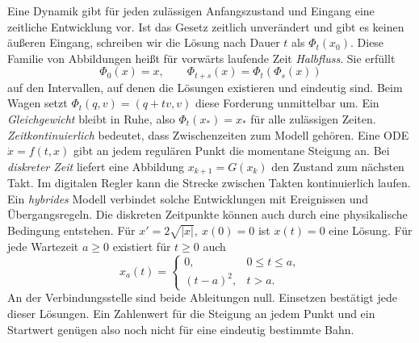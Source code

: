Eine Dynamik gibt für jeden zulässigen Anfangszustand und Eingang eine zeitliche Entwicklung vor. Ist das Gesetz zeitlich unverändert und gibt es keinen äußeren Eingang, schreiben wir die Lösung nach Dauer \(t\) als \(\Phi_t(x_0)\). Diese Familie von Abbildungen heißt für vorwärts laufende Zeit \emph{Halbfluss}. Sie erfüllt
\[
 \Phi_0(x)=x,\qquad \Phi_{t+s}(x)=\Phi_t(\Phi_s(x))
\]
auf den Intervallen, auf denen die Lösungen existieren und eindeutig sind. Beim Wagen setzt \(\Phi_t(q,v)=(q+tv,v)\) diese Forderung unmittelbar um. Ein \emph{Gleichgewicht} bleibt in Ruhe, also \(\Phi_t(x_*)=x_*\) für alle zulässigen Zeiten.
\emph{Zeitkontinuierlich} bedeutet, dass Zwischenzeiten zum Modell gehören. Eine ODE \(\dot x=f(t,x)\) gibt an jedem regulären Punkt die momentane Steigung an. Bei \emph{diskreter Zeit} liefert eine Abbildung \(x_{k+1}=G(x_k)\) den Zustand zum nächsten Takt. Im digitalen Regler kann die Strecke zwischen Takten kontinuierlich laufen. Ein \emph{hybrides} Modell verbindet solche Entwicklungen mit Ereignissen und Übergangsregeln. Die diskreten Zeitpunkte können auch durch eine physikalische Bedingung entstehen.
Für \(x'=2\sqrt{|x|},\ x(0)=0\) ist \(x(t)=0\) eine Lösung. Für jede Wartezeit \(a\ge0\) existiert für \(t\ge0\) auch
\[
 x_a(t)=\begin{cases}0,&0\le t\le a,\\(t-a)^2,&t>a.\end{cases}
\]
An der Verbindungsstelle sind beide Ableitungen null. Einsetzen bestätigt jede dieser Lösungen. Ein Zahlenwert für die Steigung an jedem Punkt und ein Startwert genügen also noch nicht für eine eindeutig bestimmte Bahn.

